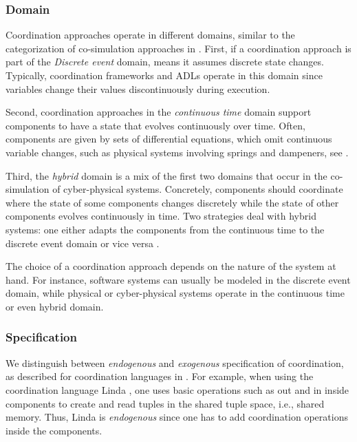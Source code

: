 \documentclass[runningheads]{llncs}
\begin{document}
\subsubsection{Domain} Coordination approaches operate in different domains, similar to the categorization of co-simulation approaches in \cite{gomesCoSimulationSurvey2019}.
First, if a coordination approach is part of the \textit{Discrete event} domain, means it assumes discrete state changes.
Typically, coordination frameworks and ADLs operate in this domain since variables change their values discontinuously during execution.

Second, coordination approaches in the \textit{continuous time} domain support components to have a state that evolves continuously over time.
Often, components are given by sets of differential equations, which omit continuous variable changes, such as physical systems involving springs and dampeners, see \cite{gomesCoSimulationSurvey2019}.

Third, the \textit{hybrid} domain is a mix of the first two domains that occur in the co-simulation of cyber-physical systems.
Concretely, components should coordinate where the state of some components changes discretely while the state of other components evolves continuously in time.
Two strategies deal with hybrid systems: one either adapts the components from the continuous time to the discrete event domain or vice versa \cite{gomesCoSimulationSurvey2019}.

The choice of a coordination approach depends on the nature of the system at hand.
For instance, software systems can usually be modeled in the discrete event domain, while physical or cyber-physical systems operate in the continuous time or even hybrid domain.

\subsubsection{Specification} We distinguish between \textit{endogenous} and \textit{exogenous} specification of coordination, as described for coordination languages in \cite{arbabWhatYouMean1998}.
For example, when using the coordination language Linda \cite{carrieroLindaContext1989}, one uses basic operations such as \textsf{out} and \textsf{in} inside components to create and read tuples in the shared tuple space, i.e., shared memory.
Thus, Linda is \textit{endogenous} since one has to add coordination operations inside the components.
\end{document}
